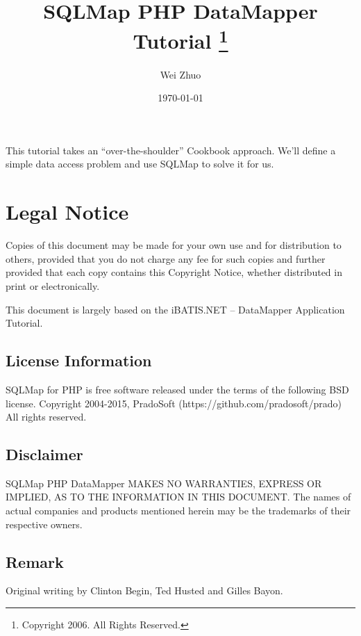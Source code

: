 \documentclass{article}
\title{\vspace{-2.5cm} \bfseries SQLMap PHP DataMapper Tutorial
    \thanks{Copyright 2006. All Rights Reserved.}
}
\author{Wei Zhuo}
\date{\today}
\begin{document}
\maketitle

This tutorial takes an ``over-the-shoulder'' Cookbook approach. We'll define a
simple data access problem and use SQLMap to solve it for us.


\section*{Legal Notice}

Copies of this document may be made for your own use and for distribution to
others, provided that you do not charge any fee for such copies and further
provided that each copy contains this Copyright Notice, whether distributed in
print or electronically.

This document is largely based on the iBATIS.NET -- DataMapper Application
Tutorial.

\subsection*{License Information}
SQLMap for PHP is free software released under the terms of the following BSD
license. Copyright 2004-2015, PradoSoft (https://github.com/pradosoft/prado) All rights
reserved.

\subsection*{Disclaimer}
SQLMap PHP DataMapper MAKES NO WARRANTIES, EXPRESS OR IMPLIED, AS TO THE
INFORMATION IN THIS DOCUMENT. The names of actual companies and products
mentioned herein may be the trademarks of their respective owners.

\subsection*{Remark}
Original writing by Clinton Begin, Ted Husted and Gilles Bayon.




\end{document}
